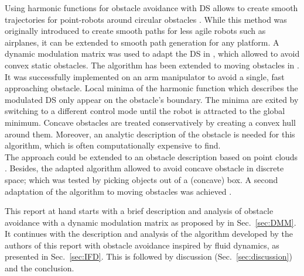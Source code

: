 Using harmonic functions for obstacle avoidance with DS allows to create smooth trajectories for point-robots around circular obstacles \cite{waydo2003vehicle}. While this method was originally introduced to create smooth paths for less agile robots such as airplanes, it can be extended to smooth path generation for any platform. A dynamic modulation matrix was used to adapt the DS in \cite{khansari2012realtime,}, which allowed to avoid convex static obstacles. The algorithm has been extended to moving obstacles in \cite{khansari2012dynamical}. It was successfully implemented on an arm manipulator to avoid a single, fast approaching obstacle. Local minima of the harmonic function which describes the modulated DS only appear on the obstacle's boundary. The minima are exited by switching to a different control mode until the robot is attracted to the global minimum. Concave obstacles are treated conservatively by creating a convex hull around them. Moreover, an analytic description of the obstacle is needed for this algorithm, which is often computationally expensive to find. \\
The approach could be extended to an obstacle description based on point clouds \cite{saveriano2013point,}. Besides, the adapted algorithm allowed to avoid concave obstacle in discrete space; which was tested by picking objects out of a (concave) box. A second adaptation of the algorithm to moving obstacles was achieved  \cite{saveriano2014distance}.




This report at hand starts with a brief description and analysis of obstacle avoidance with a dynamic modulation matrix as proposed by \cite{khansari2012dynamical} in Sec.~\ref{sec:DMM}. It continues with the description and analysis of the algorithm developed by the authors of this report with obstacle avoidance inspired by fluid dynamics, as presented in Sec.~\ref{sec:IFD}. %
This is followed by discussion (Sec.~\ref{sec:discussion}) and the conclusion.




